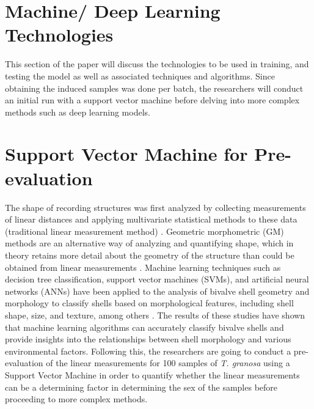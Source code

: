 \section{Machine/ Deep Learning Technologies}
This section of the paper will discuss the technologies to be used in training, and testing the model as well as associated techniques and algorithms.  Since obtaining the induced samples was done per batch, the researchers will conduct an initial run with a support vector machine before delving into more complex methods such as deep learning models. 

\section{Support Vector Machine for Pre-evaluation }
\label{sec:svm}

The shape of recording structures was first analyzed by collecting measurements of linear distances and applying multivariate statistical methods to these data (traditional linear measurement method) \cite{rohlf1984}. Geometric morphometric (GM) methods are an alternative way of analyzing and quantifying shape, which in theory retains more detail about the geometry of the structure than could be obtained from linear measurements \cite{adams2004}. Machine learning techniques such as decision tree classification, support vector machines (SVMs), and artificial neural networks (ANNs) have been applied to the analysis of bivalve shell geometry and morphology to classify shells based on morphological features, including shell shape, size, and texture, among others \cite{kiel2021}. The results of these studies have shown that machine learning algorithms can accurately classify bivalve shells and provide insights into the relationships between shell morphology and various environmental factors.
Following this, the researchers are going to conduct a pre-evaluation of the linear measurements for 100 samples of \textit{T. granosa} using a Support Vector Machine in order to quantify whether the linear measurements can be a determining factor in determining the sex of the samples before proceeding to more complex methods. 

